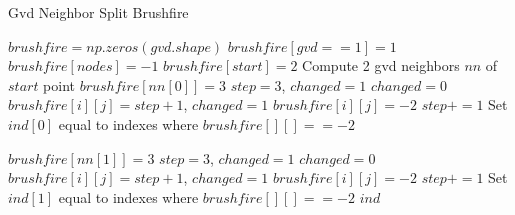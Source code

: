 \begin{algorithm}[H]
\caption{Gvd Neighbor Split Brushfire}
\label{alg:gvdNeighborSplitBrushfire}
\begin{algorithmic}[1]
        \State $brushfire = np.zeros(gvd.shape)$
        \State $brushfire[gvd == 1] = 1$
        \State $brushfire[nodes] = -1$
        \State $brushfire[start] = 2$
        \State Compute 2 gvd neighbors $nn$ of $start$ point
        \State $brushfire[nn[0]] = 3$
        \State $step = 3$, $changed = 1$
            \State $changed = 0$
                        \State $brushfire[i][j] = step + 1$, $changed = 1$
                        \State $brushfire[i][j] = -2$
                    \EndIf
                \EndFor
            \EndFor
            \State $step += 1$
        \EndWhile
        \State Set $ind[0]$ equal to indexes where $brushfire[][] == -2$
        
        \State $brushfire[nn[1]] = 3$
        \State $step = 3$, $changed = 1$
            \State $changed = 0$
                        \State $brushfire[i][j] = step + 1$, $changed = 1$
                        \State $brushfire[i][j] = -2$
                    \EndIf
                \EndFor
            \EndFor
            \State $step += 1$
        \EndWhile
        \State Set $ind[1]$ equal to indexes where $brushfire[][] == -2$
        \State \Return $ind$
\end{algorithmic}
\end{algorithm}



